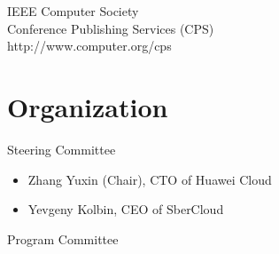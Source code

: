 \documentclass[12pt,twosides]{book}
\begin{document}
\begin{center}
IEEE Computer Society\\
Conference Publishing Services (CPS)\\
http://www.computer.org/cps
\end{center}

\newpage

\section*{Organization}

\begin{multicols}{2}
\raggedright
Steering Committee

\begin{itemize}
\item Zhang Yuxin (Chair), CTO of Huawei Cloud
\item Yevgeny Kolbin, CEO of SberCloud
\end{itemize}

Program Committee


\end{multicols}
\end{document}
